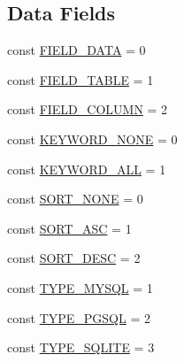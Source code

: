 \subsection*{Data Fields}
\begin{DoxyCompactItemize}
\item 
const \hyperlink{class_database_ac3188f4350978425c488580c5cea8468}{F\+I\+E\+L\+D\+\_\+\+D\+A\+T\+A} = 0
\item 
const \hyperlink{class_database_acbdf154a35cfc228dd1016e8aa4bd503}{F\+I\+E\+L\+D\+\_\+\+T\+A\+B\+L\+E} = 1
\item 
const \hyperlink{class_database_a87aad3e89cc6a17f293cf5410b225bbe}{F\+I\+E\+L\+D\+\_\+\+C\+O\+L\+U\+M\+N} = 2
\item 
const \hyperlink{class_database_a9b1a24ef01d468c146a71b333edb0c17}{K\+E\+Y\+W\+O\+R\+D\+\_\+\+N\+O\+N\+E} = 0
\item 
const \hyperlink{class_database_ababb5c4af464938f3f0b8f9c4fa183ba}{K\+E\+Y\+W\+O\+R\+D\+\_\+\+A\+L\+L} = 1
\item 
const \hyperlink{class_database_af3826c676cb54905f393f9d1f7ad48ea}{S\+O\+R\+T\+\_\+\+N\+O\+N\+E} = 0
\item 
const \hyperlink{class_database_a9517f2622dfc5fbb0cc64feef247eb06}{S\+O\+R\+T\+\_\+\+A\+S\+C} = 1
\item 
const \hyperlink{class_database_a0e633ab431ae1e5cc483a37cfe73bb09}{S\+O\+R\+T\+\_\+\+D\+E\+S\+C} = 2
\item 
const \hyperlink{class_database_ab93424c90d1a3c44eb13221df4a4f773}{T\+Y\+P\+E\+\_\+\+M\+Y\+S\+Q\+L} = 1
\item 
const \hyperlink{class_database_a50a87e8333b1ab093dbeecda41fe4335}{T\+Y\+P\+E\+\_\+\+P\+G\+S\+Q\+L} = 2
\item 
const \hyperlink{class_database_ad651a8cde87b429d4335e15dd6551ca9}{T\+Y\+P\+E\+\_\+\+S\+Q\+L\+I\+T\+E} = 3
\end{DoxyCompactItemize}
